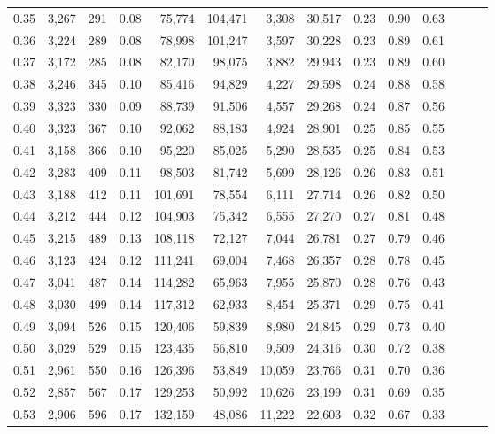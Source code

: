 \begin{tabular}{rrrrrrrrrrrrrr}
0.35 &  3,267 &  291 &  0.08 &   75,774 &  104,471 &   3,308 &  30,517 &  0.23 &  0.90 &      0.63 \\
0.36 &  3,224 &  289 &  0.08 &   78,998 &  101,247 &   3,597 &  30,228 &  0.23 &  0.89 &      0.61 \\
0.37 &  3,172 &  285 &  0.08 &   82,170 &   98,075 &   3,882 &  29,943 &  0.23 &  0.89 &      0.60 \\
0.38 &  3,246 &  345 &  0.10 &   85,416 &   94,829 &   4,227 &  29,598 &  0.24 &  0.88 &      0.58 \\
0.39 &  3,323 &  330 &  0.09 &   88,739 &   91,506 &   4,557 &  29,268 &  0.24 &  0.87 &      0.56 \\
0.40 &  3,323 &  367 &  0.10 &   92,062 &   88,183 &   4,924 &  28,901 &  0.25 &  0.85 &      0.55 \\
0.41 &  3,158 &  366 &  0.10 &   95,220 &   85,025 &   5,290 &  28,535 &  0.25 &  0.84 &      0.53 \\
0.42 &  3,283 &  409 &  0.11 &   98,503 &   81,742 &   5,699 &  28,126 &  0.26 &  0.83 &      0.51 \\
0.43 &  3,188 &  412 &  0.11 &  101,691 &   78,554 &   6,111 &  27,714 &  0.26 &  0.82 &      0.50 \\
0.44 &  3,212 &  444 &  0.12 &  104,903 &   75,342 &   6,555 &  27,270 &  0.27 &  0.81 &      0.48 \\
0.45 &  3,215 &  489 &  0.13 &  108,118 &   72,127 &   7,044 &  26,781 &  0.27 &  0.79 &      0.46 \\
0.46 &  3,123 &  424 &  0.12 &  111,241 &   69,004 &   7,468 &  26,357 &  0.28 &  0.78 &      0.45 \\
0.47 &  3,041 &  487 &  0.14 &  114,282 &   65,963 &   7,955 &  25,870 &  0.28 &  0.76 &      0.43 \\
0.48 &  3,030 &  499 &  0.14 &  117,312 &   62,933 &   8,454 &  25,371 &  0.29 &  0.75 &      0.41 \\
0.49 &  3,094 &  526 &  0.15 &  120,406 &   59,839 &   8,980 &  24,845 &  0.29 &  0.73 &      0.40 \\
0.50 &  3,029 &  529 &  0.15 &  123,435 &   56,810 &   9,509 &  24,316 &  0.30 &  0.72 &      0.38 \\
0.51 &  2,961 &  550 &  0.16 &  126,396 &   53,849 &  10,059 &  23,766 &  0.31 &  0.70 &      0.36 \\
0.52 &  2,857 &  567 &  0.17 &  129,253 &   50,992 &  10,626 &  23,199 &  0.31 &  0.69 &      0.35 \\
0.53 &  2,906 &  596 &  0.17 &  132,159 &   48,086 &  11,222 &  22,603 &  0.32 &  0.67 &      0.33 \\

\end{tabular}
